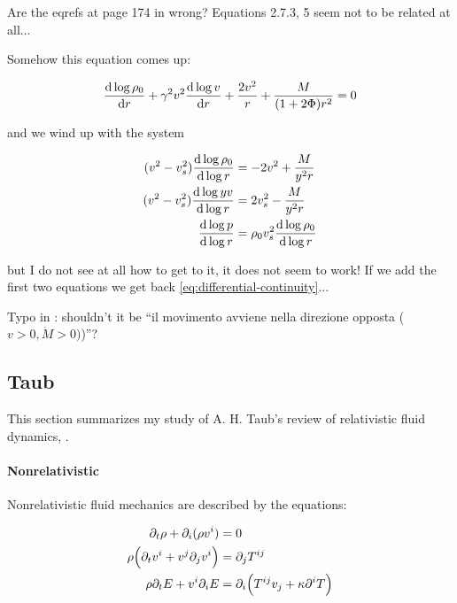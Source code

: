 \documentclass[main.tex]{subfiles}
\begin{document}
\begin{greenbox}
  Are the eqrefs at page 174 in \cite{nobili} wrong? Equations 2.7.3, 5 seem not to be related at all...

  Somehow this equation comes up:

  \begin{equation}
    \dv{\log \rho_0 }{r} + \gamma^2 v^2 \dv{\log v }{r}  + \frac{2 v^2}{r} + \frac{M}{(1+2 \Phi) r^2} = 0
  \end{equation}

  and we wind up with the system

  \begin{subequations}
  \begin{align}
    (v^2-v_s^2) \dv{\log \rho_0}{\log r} &= - 2v^2 + \frac{M}{y^2 r}  \\
    (v^2-v_s^2) \dv{\log yv }{\log r} &=  2v_s^2 - \frac{M}{y^2 r}  \\
    \dv{\log p }{\log r} &= \rho_0 v_s^2 \dv{\log \rho_0}{\log r }
  \end{align}
  \end{subequations}

  but I do not see at all how to get to it, it does not seem to work!
  If we add the first two equations we get back \eqref{eq:differential-continuity}...
\end{greenbox}

\begin{greenbox}
  Typo in \cite[page 175]{nobili}: shouldn't it be ``il movimento avviene nella direzione opposta (\(v>0, \dot{M}>0)\))''?
\end{greenbox}

\subsection{Taub}

This section summarizes my study of A. H. Taub's review of relativistic fluid dynamics, \cite{taub}.

\paragraph{Nonrelativistic}

Nonrelativistic fluid mechanics are described by the equations:

\begin{subequations}
\begin{align}
    \partial_t \rho + \partial_i (\rho v^i) &= 0 \\
    \rho \qty(\partial_t v^i + v^j \partial_j v^i) &= \partial_j T^{ij} \\
    \rho \partial_t E + v^i \partial_i E &= \partial_i \qty(T^{ij}v_j + \kappa\partial^i T)
\end{align}
\end{subequations}
\end{document}
